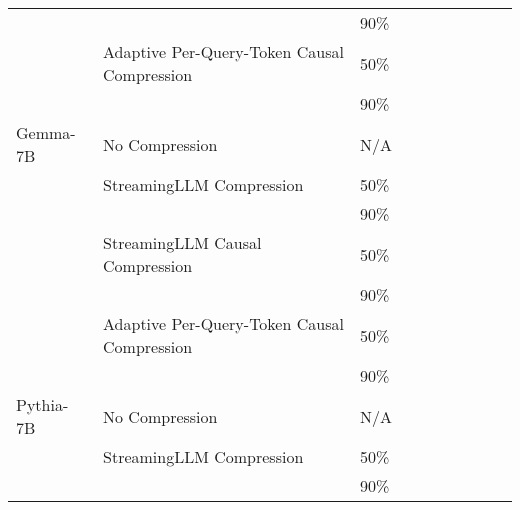 \begin{table}[H]
{\begin{tabular}{@{}llllllllll@{}}
                      &                                             & 90\%              &       &       &           &         &            &       &            \\
                      & Adaptive Per-Query-Token Causal Compression & 50\%              &       &       &           &         &            &       &            \\
                      &                                             & 90\%              &       &       &           &         &            &       &            \\ \midrule
            Gemma-7B  & No Compression                              & N/A               &       &       &           &         &            &       &            \\
                      & StreamingLLM Compression                    & 50\%              &       &       &           &         &            &       &            \\
                      &                                             & 90\%              &       &       &           &         &            &       &            \\
                      & StreamingLLM Causal Compression             & 50\%              &       &       &           &         &            &       &            \\
                      &                                             & 90\%              &       &       &           &         &            &       &            \\
                      & Adaptive Per-Query-Token Causal Compression & 50\%              &       &       &           &         &            &       &            \\
                      &                                             & 90\%              &       &       &           &         &            &       &            \\ \midrule
            Pythia-7B & No Compression                              & N/A               &       &       &           &         &            &       &            \\
                      & StreamingLLM Compression                    & 50\%              &       &       &           &         &            &       &            \\
                      &                                             & 90\%              &       &       &           &         &            &       &            \\

\end{tabular}}
\end{table}
